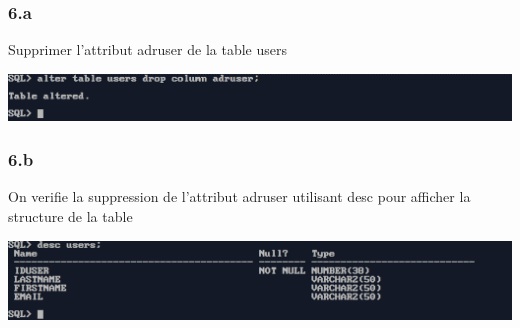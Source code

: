\subsubsection*{6.a}
Supprimer l'attribut adruser de la table users



\begin{center}
    \includegraphics[width=\textwidth]{ScreenShot/Partie2/drop.png}
\end{center}

\vspace{0.25cm}
\subsubsection*{6.b}
On verifie la suppression de l'attribut adruser utilisant desc pour afficher la structure de la table



\begin{center}
    \includegraphics[width=\textwidth]{ScreenShot/Partie2/verifydrop.png}
\end{center}
